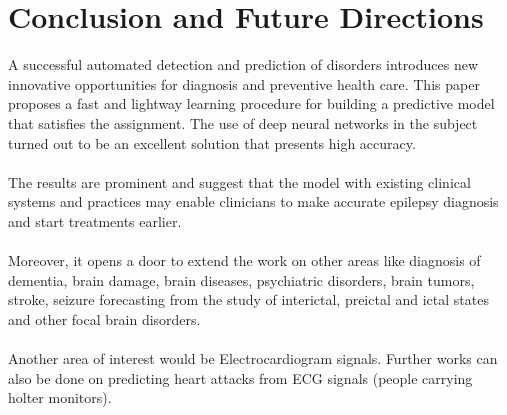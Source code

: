 \documentclass{llncs}       %
\begin{document}
\paragraph{}\paragraph{}
\paragraph{}\paragraph{}
\paragraph{}\paragraph{}


\section{Conclusion and Future Directions}
\label{sec:4}



 A successful automated detection and prediction of disorders introduces new innovative opportunities for diagnosis and preventive health care. This paper proposes a fast and lightway learning procedure for building a predictive model that satisfies the assignment. The use of deep neural networks in the subject turned out to be an excellent solution that presents high accuracy.  
\paragraph{}
The results are prominent and suggest that the model with existing clinical systems and practices may enable clinicians to make accurate epilepsy diagnosis and start  treatments earlier.
\paragraph{}
Moreover, it opens a door to extend the work on other areas like diagnosis of dementia, brain damage, brain diseases, psychiatric disorders, brain tumors, stroke, seizure forecasting from the study of interictal, preictal and ictal states and other focal brain disorders. 
\paragraph{}
Another area of interest would be Electrocardiogram signals. Further works can also be done on predicting heart attacks from ECG signals (people carrying holter monitors). 
\end{document}
